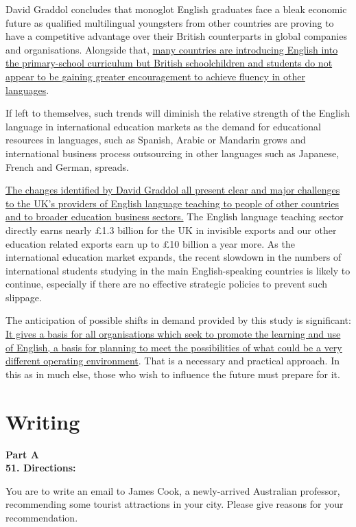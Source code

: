 David Graddol concludes that monoglot English graduates face a bleak
economic future as qualified multilingual youngsters from other
countries are proving to have a competitive advantage over their British
counterparts in global companies and organisations. Alongside that,
\transnum \uline{many countries are introducing English into the
	primary-school curriculum but British schoolchildren and students do not
	appear to be gaining greater encouragement to achieve fluency in other
	languages}.

If left to themselves, such trends will diminish the relative strength
of the English language in international education markets as the demand
for educational resources in languages, such as Spanish, Arabic or
Mandarin grows and international business process outsourcing in other
languages such as Japanese, French and German, spreads.

\transnum \uline{The changes identified by David Graddol all present
	clear and major challenges to the UK's providers of English language
	teaching to people of other countries and to broader education business
	sectors.} The English language teaching sector directly earns nearly
£1.3 billion for the UK in invisible exports and our other education
related exports earn up to £10 billion a year more. As the international
education market expands, the recent slowdown in the numbers of
international students studying in the main English-speaking countries
is likely to continue, especially if there are no effective strategic
policies to prevent such slippage.

The anticipation of possible shifts in demand provided by this study is
significant: \transnum \uline{It gives a basis for all organisations
	which seek to promote the learning and use of English, a basis for
	planning to meet the possibilities of what could be a very different
	operating environment}. That is a necessary and practical approach. In
this as in much else, those who wish to influence the future must
prepare for it.


\newpage

\section{Writing}


\noindent
\textbf{Part A}\\
\textbf{51. Directions:}

You are to write an email to James Cook, a newly-arrived Australian
professor, recommending some tourist attractions in your city. Please
give reasons for your recommendation.

